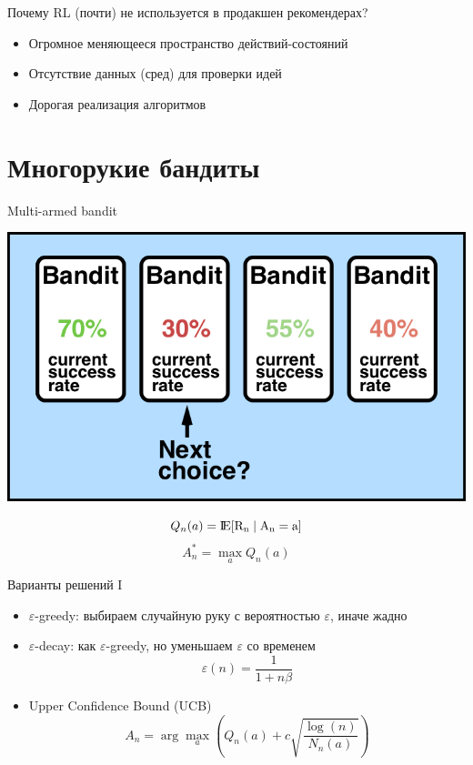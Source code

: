 \documentclass[11pt,aspectratio=169,handout]{beamer}
\begin{document}
\begin{frame}{Почему RL (почти) не используется в продакшен рекомендерах?}

\begin{tcolorbox}[colback=warn!5,colframe=warn!80,title=]
\begin{itemize}[<+->]
\item Огромное меняющееся пространство действий-состояний
\item Отсутствие данных (сред) для проверки идей
\item Дорогая реализация алгоритмов
\end{itemize}
\end{tcolorbox}

\end{frame}

\section{Многорукие бандиты}

\begin{frame}{Multi-armed bandit}

\begin{center}
\includegraphics[scale=0.3]{images/mab.png}
\end{center}

\[
Q_n(a) = \rm I\!E[R_n \mid A_n = a]
\]
\[
A^*_n = \max_a Q_n(a)
\]

\end{frame}

\begin{frame}{Варианты решений I \cite{BANDITS1}}

\begin{itemize}
\item $\varepsilon$-greedy: выбираем случайную руку с вероятностью $\varepsilon$, иначе жадно
\item $\varepsilon$-decay: как $\varepsilon$-greedy, но уменьшаем $\varepsilon$ со временем
\[
\varepsilon(n) = \frac{1}{1 + n \beta}
\]
\item Upper Confidence Bound (UCB)
\[
A_n = \arg \max_a \left( Q_n(a) + c \sqrt{\frac{\log(n)}{N_n(a)}} \right)
\]
\end{itemize}

\end{frame}
\end{document}
